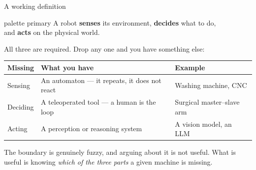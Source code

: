 \documentclass[aspectratio=169]{beamer}
\begin{document}
\begin{frame}{A working definition}
  \begin{beamercolorbox}[sep=8pt,center,rounded=true]{palette primary}
    \large A robot \textbf{senses} its environment, \textbf{decides} what to do,\\
    and \textbf{acts} on the physical world.
  \end{beamercolorbox}

  \vspace{1.0em}
  All three are required. Drop any one and you have something else:

  \begin{center}\small
  \begin{tabular}{@{}lll@{}}
    \toprule
    \textbf{Missing} & \textbf{What you have} & \textbf{Example} \\
    \midrule
    Sensing  & An automaton --- it repeats, it does not react & Washing machine, CNC \\
    Deciding & A teleoperated tool --- a human is the loop    & Surgical master--slave arm \\
    Acting   & A perception or reasoning system               & A vision model, an LLM \\
    \bottomrule
  \end{tabular}
  \end{center}

  \vspace{0.7em}
  \small The boundary is genuinely fuzzy, and arguing about it is not useful. What is useful
  is knowing \emph{which of the three parts} a given machine is missing.
\end{frame}
\end{document}
